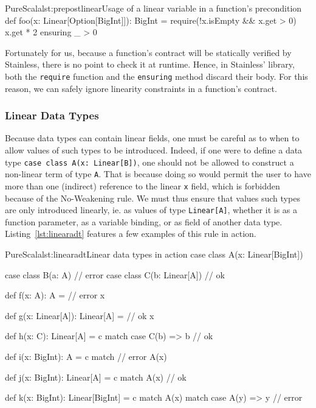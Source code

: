\documentclass[a4paper,twoside]{article}
\newcommand{\RefCode}[1]{Listing~\ref{#1}}
\newcommand{\stt}[1]{\texttt{\small{#1}}}
\begin{document}
\begin{Code}{PureScala}{lst:prepostlinear}{Usage of a linear variable in a function's precondition}
def foo(x: Linear[Option[BigInt]]): BigInt = {
  require(!x.isEmpty && x.get > 0)
  x.get * 2
} ensuring { _ > 0 }
\end{Code}

Fortunately for us, because a function's contract will be statically verified by Stainless, there is no point to check it at runtime. Hence, in Stainless' library, both the \stt{require} function and the \stt{ensuring} method discard their body. For this reason, we can safely ignore linearity constraints in a function's contract.\\

\subsubsection*{Linear Data Types}

Because data types can contain linear fields, one must be careful as to when to allow values of such types to be introduced. Indeed, if one were to define a data type \stt{case class A(x:\,Linear[B])}, one should not be allowed to construct a non-linear term of type \stt{A}. That is because doing so would permit the user to have more than one (indirect) reference to the linear \stt{x} field, which is forbidden because of the No-Weakening rule. We must thus ensure that values such types are only introduced linearly, ie. as values of type \stt{Linear[A]}, whether it is as a function parameter, as a variable binding, or as field of another data type. \RefCode{lst:linearadt} features a few examples of this rule in action.

\begin{Code}{PureScala}{lst:linearadt}{Linear data types in action}
case class A(x: Linear[BigInt])

case class B(a: A)          // error
case class C(b: Linear[A])  // ok

def f(x: A): A = { // error
  x
}

def g(x: Linear[A]): Linear[A] = { // ok
  x
}

def h(x: C): Linear[A] = c match {
  case C(b) => b // ok
}

def i(x: BigInt): A = c match { // error
  A(x)
}

def j(x: BigInt): Linear[A] = c match {
  A(x) // ok
}

def k(x: BigInt): Linear[BigInt] = c match {
  A(x) match {
    case A(y) => y // error
  }
}
\end{Code}
\end{document}
